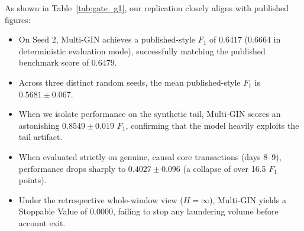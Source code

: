 \documentclass[10pt,twocolumn,letterpaper]{article}
\begin{document}
\begin{table}[ht]
\centering
\small
\caption{\textbf{Gate G1 Multi-Seed Baseline Audit (`HI-Small', Multi-GIN).} Comparison of published-style retrospective test $F_1$, official published reference, causal Core $F_1$ (tail removed), synthetic Tail $F_1$, and Stoppable Value ($\text{SV}_{500}$).}
\label{tab:gate_g1}
\end{table}

As shown in Table~\ref{tab:gate_g1}, our replication closely aligns with published figures:
\begin{itemize}[leftmargin=*]
    \item On Seed 2, Multi-GIN achieves a published-style $F_1$ of \textbf{$0.6417$} ($0.6664$ in deterministic evaluation mode), successfully matching the published benchmark score of $0.6479$.
    \item Across three distinct random seeds, the mean published-style $F_1$ is $0.5681 \pm 0.067$.
    \item When we isolate performance on the synthetic tail, Multi-GIN scores an astonishing \textbf{$0.8549 \pm 0.019$} $F_1$, confirming that the model heavily exploits the tail artifact.
    \item When evaluated strictly on genuine, causal core transactions (days 8--9), performance drops sharply to \textbf{$0.4027 \pm 0.096$} (a collapse of over 16.5 $F_1$ points).
    \item Under the retrospective whole-window view ($H=\infty$), Multi-GIN yields a Stoppable Value of \textbf{$0.0000$}, failing to stop any laundering volume before account exit.
\end{itemize}
\end{document}
